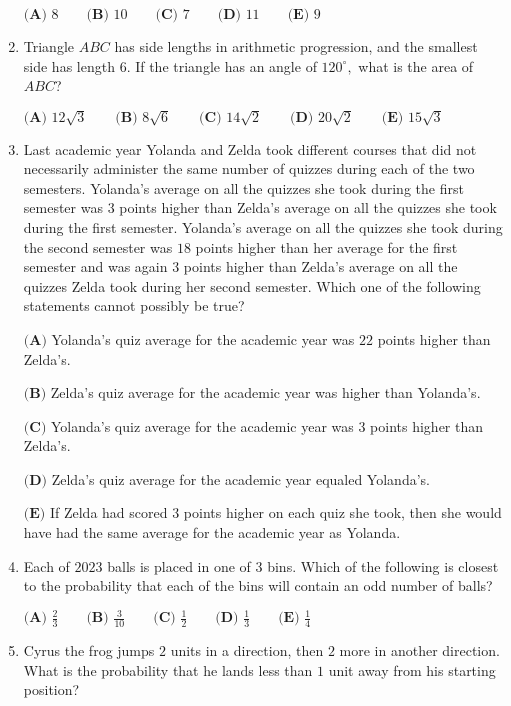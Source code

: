 \documentclass{article}
\begin{document}
\begin{enumerate}[label=\arabic*., itemsep=0.5em]
$\textbf{(A) }8\qquad\textbf{(B) }10\qquad\textbf{(C) }7\qquad\textbf{(D) }11\qquad\textbf{(E) }9$\par \vspace{0.5em}\item Triangle $ABC$ has side lengths in arithmetic progression, and the smallest side has length $6$. If the triangle has an angle of $120^\circ,$ what is the area of $ABC$?

$\textbf{(A) }12\sqrt{3}\qquad\textbf{(B) }8\sqrt{6}\qquad\textbf{(C) }14\sqrt{2}\qquad\textbf{(D) }20\sqrt{2}\qquad\textbf{(E) }15\sqrt{3}$\par \vspace{0.5em}\item Last academic year Yolanda and Zelda took different courses that did not necessarily administer the same number of quizzes during each of the two semesters. Yolanda's average on all the quizzes she took during the first semester was $3$ points higher than Zelda's average on all the quizzes she took during the first semester. Yolanda's average on all the quizzes she took during the second semester was $18$ points higher than her average for the first semester and was again $3$ points higher than Zelda's average on all the quizzes Zelda took during her second semester. Which one of the following statements cannot possibly be true?

$\textbf{(A)}$ Yolanda's quiz average for the academic year was $22$ points higher than Zelda's.

$\textbf{(B)}$ Zelda's quiz average for the academic year was higher than Yolanda's.

$\textbf{(C)}$ Yolanda's quiz average for the academic year was $3$ points higher than Zelda's.

$\textbf{(D)}$ Zelda's quiz average for the academic year equaled Yolanda's.

$\textbf{(E)}$ If Zelda had scored $3$ points higher on each quiz she took, then she would have had the same average for the academic year as Yolanda.\par \vspace{0.5em}\item Each of $2023$ balls is placed in one of $3$ bins. Which of the following is closest to the probability that each of the bins will contain an odd number of balls?

$\textbf{(A) } \frac{2}{3} \qquad \textbf{(B) } \frac{3}{10} \qquad \textbf{(C) } \frac{1}{2} \qquad \textbf{(D) } \frac{1}{3} \qquad \textbf{(E) } \frac{1}{4}$\par \vspace{0.5em}\item Cyrus the frog jumps $2$ units in a direction, then $2$ more in another direction. What is the probability that he lands less than $1$ unit away from his starting position?


\end{enumerate}
\end{document}
